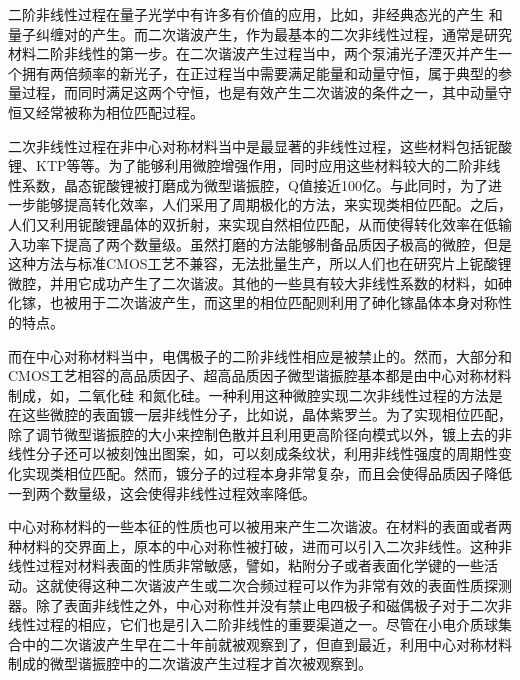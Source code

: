 \documentclass[UTF8,a4paper,cs4size,hyperref]{ctexart}
\begin{document}
二阶非线性过程在量子光学中有许多有价值的应用，比如，非经典态光的产生\cite{scully1999quantum}	和量子纠缠对的产生\cite{xu2008second}。而二次谐波产生，作为最基本的二次非线性过程，通常是研究材料二阶非线性的第一步。在二次谐波产生过程当中，两个泵浦光子湮灭并产生一个拥有两倍频率的新光子\cite{boyd2003nonlinear}，在正过程当中需要满足能量和动量守恒，属于典型的参量过程，而同时满足这两个守恒，也是有效产生二次谐波的条件之一，其中动量守恒又经常被称为相位匹配过程。

	二次非线性过程在非中心对称材料当中是最显著的非线性过程，这些材料包括铌酸锂、KTP等等。为了能够利用微腔增强作用，同时应用这些材料较大的二阶非线性系数，晶态铌酸锂被打磨成为微型谐振腔，Q值接近100亿\cite{ilchenko2004nonlinear}。与此同时，为了进一步能够提高转化效率，人们采用了周期极化的方法，来实现类相位匹配。之后，人们又利用铌酸锂晶体的双折射，来实现自然相位匹配，从而使得转化效率在低输入功率下提高了两个数量级\cite{furst2010naturally}。虽然打磨的方法能够制备品质因子极高的微腔，但是这种方法与标准CMOS工艺不兼容，无法批量生产，所以人们也在研究片上铌酸锂微腔，并用它成功产生了二次谐波\cite{lin2015second}。其他的一些具有较大非线性系数的材料，如砷化镓，也被用于二次谐波产生，而这里的相位匹配则利用了砷化镓晶体本身对称性的特点\cite{kuo2014second}。
	
	而在中心对称材料当中，电偶极子的二阶非线性相应是被禁止的\cite{boyd2003nonlinear}。然而，大部分和CMOS工艺相容的高品质因子、超高品质因子微型谐振腔基本都是由中心对称材料制成，如，二氧化硅\cite{armani2003ultra, kippenberg2003fabrication}	和氮化硅\cite{levy2011harmonic}。一种利用这种微腔实现二次非线性过程的方法是在这些微腔的表面镀一层非线性分子\cite{xu2008second}，比如说，晶体紫罗兰\cite{dominguez2011whispering}。为了实现相位匹配，除了调节微型谐振腔的大小来控制色散并且利用更高阶径向模式以外，镀上去的非线性分子还可以被刻蚀出图案，如，可以刻成条纹状，利用非线性强度的周期性变化实现类相位匹配\cite{dominguez2011whispering}。然而，镀分子的过程本身非常复杂，而且会使得品质因子降低一到两个数量级\cite{xu2008second}，这会使得非线性过程效率降低。
	
中心对称材料的一些本征的性质也可以被用来产生二次谐波。在材料的表面或者两种材料的交界面上，原本的中心对称性被打破，进而可以引入二次非线性\cite{heinz1991second}。这种非线性过程对材料表面的性质非常敏感，譬如，粘附分子或者表面化学键的一些活动。这就使得这种二次谐波产生或二次合频过程可以作为非常有效的表面性质探测器\cite{shen1989surface, shank1983femtosecond, heinz1985study, tom1986investigation}。除了表面非线性之外，中心对称性并没有禁止电四极子和磁偶极子对于二次非线性过程的相应\cite{heinz1991second}，它们也是引入二阶非线性的重要渠道之一。尽管在小电介质球集合中的二次谐波产生早在二十年前就被观察到了\cite{martorell1997scattering, maymo2006visible, shan2006experimental}，但直到最近，利用中心对称材料制成的微型谐振腔中的二次谐波产生过程才首次被观察到\cite{asano2016visible}。
	
\end{document}
